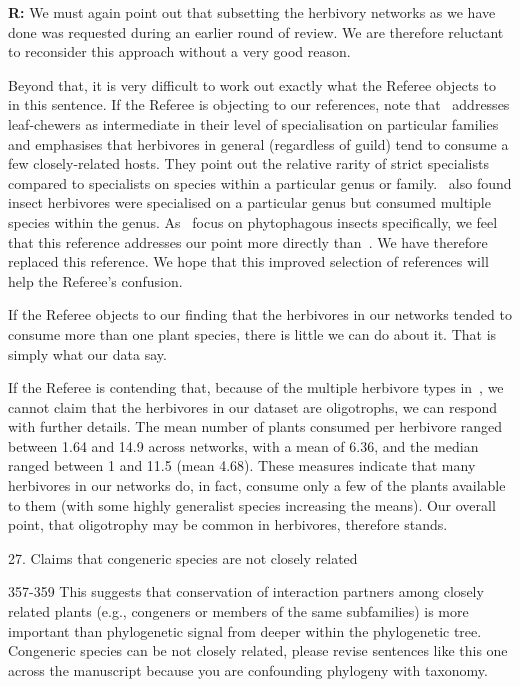 \documentclass[12pt]{letter}
\newenvironment{refquote}{\bigskip \begin{it}}{\end{it}\smallskip}
\providecommand{\DIFadd}[1]{{\protect\color{blue}\uwave{#1}}} %
\providecommand{\DIFaddbegin}{} %
\providecommand{\DIFaddend}{} %
\newcommand{\DIFaddincludegraphics}[2][]{{\color{blue}\fbox{\DIFOincludegraphics[#1]{#2}}}} %
\DeclareRobustCommand{\DIFaddbegin}{\DIFOaddbegin \let\includegraphics\DIFaddincludegraphics} %
\DeclareRobustCommand{\DIFaddend}{\DIFOaddend \let\includegraphics\DIFOincludegraphics} %
\begin{document}
		\textbf{R:} We must again point out that subsetting the herbivory networks as we have done was requested during an earlier round of review. We are therefore reluctant to reconsider this approach without a very good reason. 


		Beyond that, it is very difficult to work out exactly what the Referee objects to in this sentence. If the Referee is objecting to our references, note that~\citet{Novotny2005} addresses leaf-chewers as intermediate in their level of specialisation on particular families and emphasises that herbivores in general (regardless of guild) tend to consume a few closely-related hosts. They point out the relative rarity of strict specialists compared to specialists on species within a particular genus or family.~\citet{Brandle2006} also found insect herbivores were specialised on a particular genus but consumed multiple species within the genus. As~\citet{Brandle2006} focus on phytophagous insects specifically, we feel that this reference addresses our point more directly than~\citet{Yguel2011}. We have therefore replaced this reference. We hope that this improved selection of references will help the Referee's confusion.


		If the Referee objects to our finding that the herbivores in our networks tended to consume more than one plant species, there is little we can do about it. That is simply what our data say. 


		If the Referee is contending that, because of the multiple herbivore types in~\citet{Novotny2005}, we cannot claim that the herbivores in our dataset are oligotrophs, we can respond with further details. The mean number of plants consumed per herbivore ranged between 1.64 and 14.9 across networks, with a mean of 6.36, and the median ranged between 1 and 11.5 (mean 4.68). These measures indicate that many herbivores in our networks do, in fact, consume only a few of the plants available to them (with some highly generalist species increasing the means). Our overall point, that oligotrophy may be common in herbivores, therefore \DIFaddbegin \DIFadd{likely }\DIFaddend stands.


	27. Claims that congeneric species are not closely related 

		\begin{refquote}
			357-359 This suggests that conservation of interaction partners among closely related plants (e.g., congeners or members of the same subfamilies) is more important than phylogenetic signal from deeper within the phylogenetic tree. Congeneric species can be not closely related, please revise sentences like this one across the manuscript because you are confounding phylogeny with taxonomy.
		\end{refquote}
\end{document}
